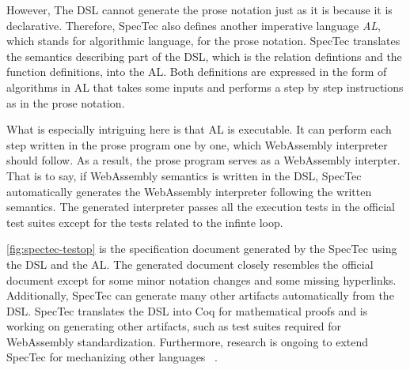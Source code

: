However, The DSL cannot generate the prose notation just as it is because it is
declarative.
Therefore, SpecTec also defines another imperative language \textit{AL}, which
stands for algorithmic language, for the prose notation.
SpecTec translates the semantics describing part of the DSL, which is the
relation defintions and the function definitions, into the AL.
Both definitions are expressed in the form of algorithms in AL that takes some
inputs and performs a step by step instructions as in the prose notation.


What is especially intriguing here is that AL is executable.
It can perform each step written in the prose program one by one, which
WebAssembly interpreter should follow.
As a result, the prose program serves as a WebAssembly interpter.
That is to say, if WebAssembly semantics is written in the DSL, SpecTec
automatically generates the WebAssembly interpreter following the written
semantics.
The generated interpreter passes all the execution tests in the official test
suites except for the tests related to the infinte loop.


\cref{fig:spectec-testop} is the specification document generated by the
SpecTec using the DSL and the AL.
The generated document closely resembles the official document except for some
minor notation changes and some missing hyperlinks.
Additionally, SpecTec can generate many other artifacts automatically from the
DSL.
SpecTec translates the DSL into Coq for mathematical proofs and is working
on generating other artifacts, such as test suites required for WebAssembly
standardization.
Furthermore, research is ongoing to extend SpecTec for mechanizing other
languages ~\cite{p4-cherry-workshop}.



